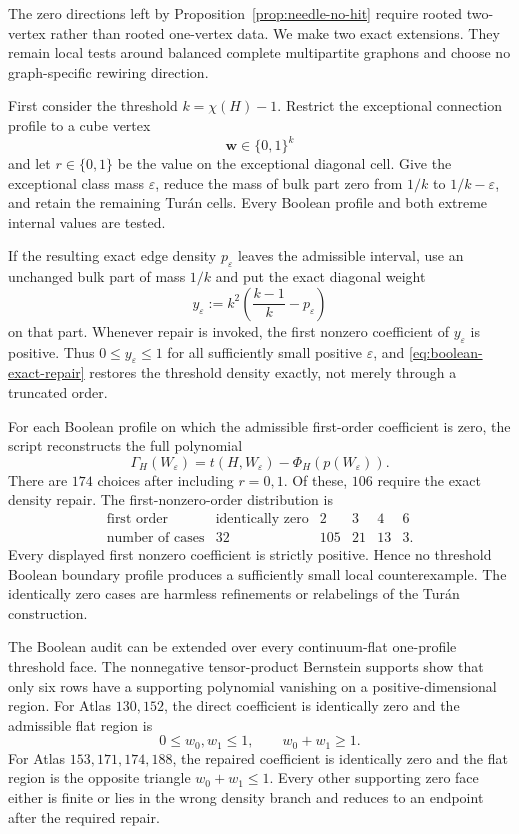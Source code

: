 \documentclass[11pt]{article}
\begin{document}
The zero directions left by Proposition~\ref{prop:needle-no-hit} require
rooted two-vertex rather than rooted one-vertex data.  We make two exact
extensions.  They remain local tests around balanced complete multipartite
graphons and choose no graph-specific rewiring direction.

First consider the threshold $k=\chi(H)-1$.  Restrict the exceptional
connection profile to a cube vertex
\[
 \boldsymbol w\in\{0,1\}^k
\]
and let $r\in\{0,1\}$ be the value on the exceptional diagonal cell.  Give
the exceptional class mass $\varepsilon$, reduce the mass of bulk part zero
from $1/k$ to $1/k-\varepsilon$, and retain the remaining Tur\'an cells.
Every Boolean profile and both extreme internal values are tested.

If the resulting exact edge density $p_{\varepsilon}$ leaves the admissible
interval, use an unchanged bulk part of mass $1/k$ and put the exact diagonal
weight
\begin{equation}
 y_{\varepsilon}
 :=k^2\left(\frac{k-1}{k}-p_{\varepsilon}\right)
 \label{eq:boolean-exact-repair}
\end{equation}
on that part.  Whenever repair is invoked, the first nonzero coefficient of
$y_{\varepsilon}$ is positive.  Thus $0\leq y_{\varepsilon}\leq1$ for all
sufficiently small positive $\varepsilon$, and
\eqref{eq:boolean-exact-repair} restores the threshold density exactly, not
merely through a truncated order.

For each Boolean profile on which the admissible first-order coefficient is
zero, the script reconstructs the full polynomial
\[
 \Gamma_H(W_{\varepsilon})
 =t(H,W_{\varepsilon})-\Phi_H(p(W_{\varepsilon})).
\]
There are $174$ choices after including $r=0,1$.  Of these, $106$ require
the exact density repair.  The first-nonzero-order distribution is
\[
\begin{array}{c|rrrrr}
\text{first order}&\text{identically zero}&2&3&4&6\\ \hline
\text{number of cases}&32&105&21&13&3.
\end{array}
\]
Every displayed first nonzero coefficient is strictly positive.  Hence no
threshold Boolean boundary profile produces a sufficiently small local
counterexample.  The identically zero cases are harmless refinements or
relabelings of the Tur\'an construction.

The Boolean audit can be extended over every continuum-flat one-profile
threshold face.  The nonnegative tensor-product Bernstein supports show that
only six rows have a supporting polynomial vanishing on a positive-dimensional
region.  For Atlas $130,152$, the direct coefficient is identically zero and
the admissible flat region is
\[
 0\leq w_0,w_1\leq1,
 \qquad w_0+w_1\geq1.
\]
For Atlas $153,171,174,188$, the repaired coefficient is identically zero and
the flat region is the opposite triangle $w_0+w_1\leq1$.  Every other
supporting zero face either is finite or lies in the wrong density branch and
reduces to an endpoint after the required repair.
\end{document}
